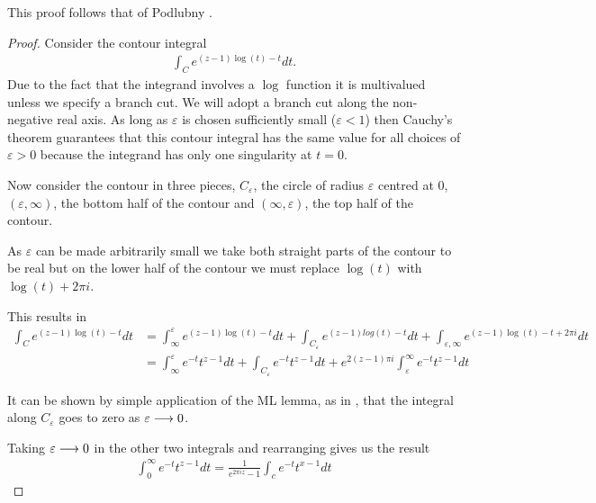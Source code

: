 This proof follows that of Podlubny \cite{Podlubny1999}.
\begin{proof}
Consider the contour integral
\begin{align*}
    \int_C e^{(z-1)\log(t) - t} dt.
\end{align*}
Due to the fact that the integrand involves a $ \log $ function it is multivalued unless we specify a branch
cut. We will adopt a branch cut along the non-negative real axis. As long as $ \varepsilon $ 
is chosen sufficiently small ($ \varepsilon < 1 $) then Cauchy's theorem guarantees that this contour 
integral has the same value for all choices of $ \varepsilon > 0 $ because the integrand has only one
singularity at $ t = 0 $.

Now consider the contour in three pieces, $ C_{\varepsilon} $, the circle of radius $ \varepsilon $ 
centred at 0, $ (\varepsilon, \infty) $, the bottom half of the contour and $ (\infty, \varepsilon) $, 
the top half of the contour. 

As $ \varepsilon $ can be made arbitrarily small we take both straight parts of the contour to be
real but on the lower half of the contour we must replace $ \log(t) $ with $ \log(t) + 2\pi i $. 

This results in 
\begin{align*}
    \int_C e^{(z-1)\log(t)-t} dt &= \int_\infty^\varepsilon e^{(z-1)\log(t) - t} dt + \int_{C_\varepsilon} 
        e^{(z-1)log(t) - t} dt + \int_{\varepsilon, \infty} e^{(z-1)\log(t) - t + 2\pi i} dt \\
    &= \int_\infty^\varepsilon e^{-t}t^{z-1}dt + \int_{C_\varepsilon} e^{-t}t^{z-1}dt +
    e^{2(z-1)\pi i} \int_\varepsilon^\infty e^{-t}t^{z-1} dt
\end{align*}


It can be shown by simple application of the ML lemma, as in \cite{Podlubny1999}, that the integral along
$ C_\varepsilon $ goes to zero as $ \varepsilon \longrightarrow 0 $.

Taking $ \varepsilon \longrightarrow 0 $ in the other two integrals and rearranging gives us the result
\begin{align}
    \label{eq:gamma_contour}
    \int_0^\infty e^{-t} t^{z-1} dt = \frac{1}{e^{2 \pi i z} - 1} \int_c e^{-t}t^{x-1} dt
\end{align}
\end{proof}


